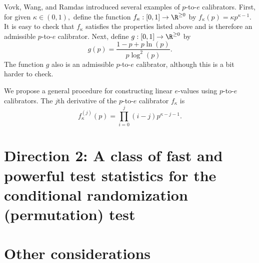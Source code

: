 \documentclass[12pt]{article}
\begin{document}
Vovk, Wang, and Ramdas introduced several examples of $p$-to-$e$ calibrators. First, for given $\kappa \in (0,1),$ define the function $f_\kappa : [0,1] \to \R^{\geq 0}$ by $f_\kappa(p) = \kappa p^{\kappa-1}$. It is easy to check that $f_\kappa$ satisfies the properties listed above and is therefore an admissible $p$-to-$e$ calibrator. Next, define $g: [0,1] \to \R^{\geq 0}$ by
$$ g(p) = \frac{1 - p + p \ln(p)}{ p \log^2(p)}.$$ The function $g$ also is an admissible $p$-to-$e$ calibrator, although this is a bit harder to check.

We propose a general procedure for constructing linear $e$-values using $p$-to-$e$ calibrators. The $j$th derivative of the $p$-to-$e$ calibrator $f_\kappa$ is $$f_\kappa^{(j)}(p) = \prod_{i=0}^j (i - j)p^{\kappa - j - 1}.$$



\section*{Direction 2: A class of fast and powerful test statistics for the conditional randomization (permutation) test}

\section{Other considerations}
\end{document}
